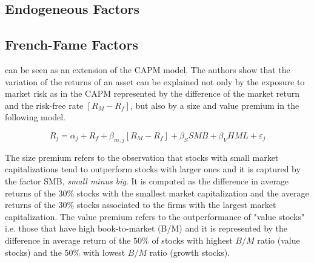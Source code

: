 \documentclass[hidelinks,11pts]{article}
\DeclareMathOperator{\1}{\mathbbm{1}}
\begin{document}
    \subsection{Endogeneous Factors}





    \subsection{French-Fame Factors}

\cite{famaCommonRiskFactors1993} can be seen as an extension of the CAPM model. 
The authors show that the variation of the returns of an asset can be explained not only by the exposure to market risk as in the CAPM represented by the difference of the market return and the risk-free rate $[R_M-R_f]$, but also by a size and value premium in the following model.
    
    \begin{equation}
        R_j = \alpha_j + R_f + \beta_{m,j}[R_M-R_f] +\beta_{S} SMB + \beta_{V}HML +\varepsilon_j
    \end{equation}

The size premium refers to the observation that stocks with small market capitalizations tend to outperform stocks with larger ones and it is captured by the factor SMB, \emph{small minus big}.
It is computed as the difference in average returns of the $30\%$ stocks with the smallest market capitalization and the average returns of the $30\%$ stocks associated to the firms with the largest market capitalization. 
The value premium refers to the outperformance of "value stocks" i.e. those that have high book-to-market (B/M) and it is represented by the difference in average return of the $50\%$ of stocks with highest $B/M$ ratio (value stocks) and the $50\%$ with lowest $B/M$ ratio (growth stocks). 
\end{document}

